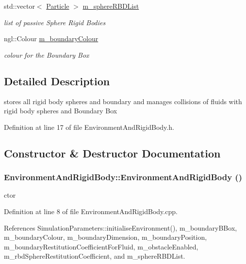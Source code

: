 \begin{DoxyCompactItemize}
std::vector$<$ \hyperlink{class_particle}{Particle} $>$ \hyperlink{class_environment_and_rigid_body_a1360e9aac7908d4a130338ee3e8c04cb}{m\_\-sphereRBDList}
\begin{DoxyCompactList}\small\item\em list of passive Sphere Rigid Bodies \item\end{DoxyCompactList}\item 
ngl::Colour \hyperlink{class_environment_and_rigid_body_a432ab35af420a258e44e77487c2abeb3}{m\_\-boundaryColour}
\begin{DoxyCompactList}\small\item\em colour for the Boundary Box \item\end{DoxyCompactList}\end{DoxyCompactItemize}


\subsection{Detailed Description}
stores all rigid body spheres and boundary and manages collisions of fluids with rigid body spheres and Boundary Box 

Definition at line 17 of file EnvironmentAndRigidBody.h.



\subsection{Constructor \& Destructor Documentation}
\hypertarget{class_environment_and_rigid_body_adbea7b16726fc80bdaa7cfe528cfe380}{
\subsubsection[{EnvironmentAndRigidBody}]{\setlength{\rightskip}{0pt plus 5cm}EnvironmentAndRigidBody::EnvironmentAndRigidBody ()}}
\label{class_environment_and_rigid_body_adbea7b16726fc80bdaa7cfe528cfe380}


ctor 



Definition at line 8 of file EnvironmentAndRigidBody.cpp.



References SimulationParameters::initialiseEnvironment(), m\_\-boundaryBBox, m\_\-boundaryColour, m\_\-boundaryDimension, m\_\-boundaryPosition, m\_\-boundaryRestitutionCoefficientForFluid, m\_\-obstacleEnabled, m\_\-rbdSphereRestitutionCoefficient, and m\_\-sphereRBDList.





